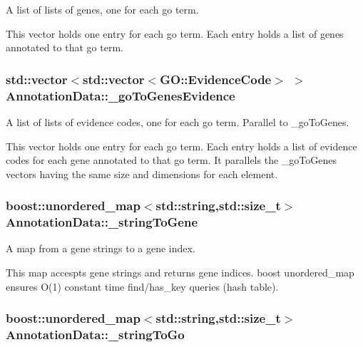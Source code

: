 A list of lists of genes, one for each go term. 

This vector holds one entry for each go term. Each entry holds a list of genes annotated to that go term. 
\subsubsection[{\texorpdfstring{\+\_\+go\+To\+Genes\+Evidence}{_goToGenesEvidence}}]{\setlength{\rightskip}{0pt plus 5cm}std\+::vector$<$std\+::vector$<${\bf G\+O\+::\+Evidence\+Code}$>$ $>$ Annotation\+Data\+::\+\_\+go\+To\+Genes\+Evidence}\hypertarget{classAnnotationData_afdad9a39d18deaf76fae099554caf86e}{}\label{classAnnotationData_afdad9a39d18deaf76fae099554caf86e}


A list of lists of evidence codes, one for each go term. Parallel to \+\_\+go\+To\+Genes. 

This vector holds one entry for each go term. Each entry holds a list of evidence codes for each gene annotated to that go term. It parallels the \+\_\+go\+To\+Genes vectors having the same size and dimensions for each element. 
\subsubsection[{\texorpdfstring{\+\_\+string\+To\+Gene}{_stringToGene}}]{\setlength{\rightskip}{0pt plus 5cm}boost\+::unordered\+\_\+map$<$std\+::string,std\+::size\+\_\+t$>$ Annotation\+Data\+::\+\_\+string\+To\+Gene}\hypertarget{classAnnotationData_a2246453b69594c15745d47f6c3c4c533}{}\label{classAnnotationData_a2246453b69594c15745d47f6c3c4c533}


A map from a gene strings to a gene index. 

This map accespts gene strings and returns gene indices. boost unordered\+\_\+map ensures O(1) constant time find/has\+\_\+key queries (hash table). 
\subsubsection[{\texorpdfstring{\+\_\+string\+To\+Go}{_stringToGo}}]{\setlength{\rightskip}{0pt plus 5cm}boost\+::unordered\+\_\+map$<$std\+::string,std\+::size\+\_\+t$>$ Annotation\+Data\+::\+\_\+string\+To\+Go}\hypertarget{classAnnotationData_ab743686bf79303fbc0eb16c323d1b104}{}\label{classAnnotationData_ab743686bf79303fbc0eb16c323d1b104}


